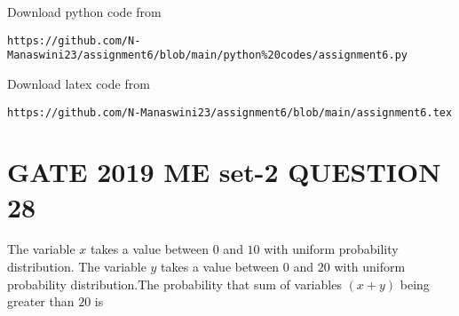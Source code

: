 \documentclass[journal,12pt,twocolumn]{IEEEtran}
\begin{document}
\renewcommand{\thefigure}{\theenumi}
\renewcommand{\thetable}{\theenumi}
Download python code from 
\begin{lstlisting}
https://github.com/N-Manaswini23/assignment6/blob/main/python%20codes/assignment6.py
\end{lstlisting}
%
Download latex code from 
\begin{lstlisting}
https://github.com/N-Manaswini23/assignment6/blob/main/assignment6.tex
\end{lstlisting}
%

\section*{GATE 2019 ME set-2 QUESTION 28}
The variable $x$ takes a value between $0$ and $10$ with uniform probability distribution. The variable $y$ takes a value between $0$ and $20$ with uniform probability distribution.The probability that sum of variables $(x+y)$ being greater than $20$ is
\end{document}
